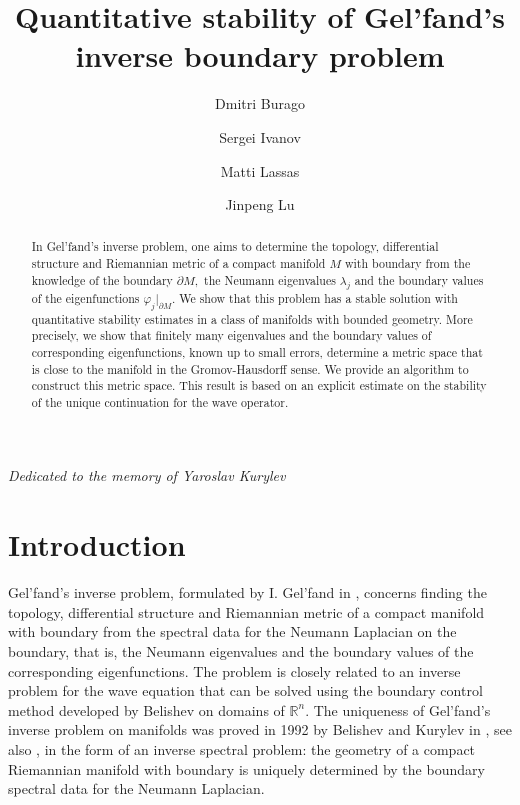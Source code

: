 \documentclass[11pt,letterpaper]{amsart}
\title[Quantitative stability of Gel'fand's inverse boundary problem]{Quantitative stability of Gel'fand's inverse boundary problem}
\author[D. Burago]{Dmitri Burago}
\author[S. Ivanov]{Sergei Ivanov}
\author[M. Lassas]{Matti Lassas}
\author[J. Lu]{Jinpeng Lu}
\date{}
\numberwithin{equation}{section}
\theoremstyle{definition}
\theoremstyle{plain}
\theoremstyle{definition}
\theoremstyle{plain}
\theoremstyle{definition}
\theoremstyle{plain}
\begin{document}
\maketitle

\vspace*{-0.5cm}
\begin{center}
\emph{Dedicated to the memory of Yaroslav Kurylev}
\end{center}

\begin{abstract}
In Gel'fand's inverse problem, one aims to determine the topology, differential structure and Riemannian metric of a compact manifold $M$ with boundary from the knowledge of the boundary $\partial M,$ the Neumann eigenvalues $\lambda_j$ and the boundary values of the eigenfunctions $\varphi_j|_{\partial M}$. We show that this problem has a stable solution with quantitative stability estimates in a class of manifolds with bounded geometry. More precisely, we show that finitely many eigenvalues and the boundary values of corresponding eigenfunctions, known up to small errors, determine a metric space that is close to the manifold in the Gromov-Hausdorff sense. We provide an algorithm to construct this metric space. This result is based on  an explicit estimate on the stability of the unique continuation for the wave operator.  
\end{abstract}


\section{Introduction} \label{section-intro}




Gel'fand's inverse problem, formulated by I. Gel'fand in \cite{G}, concerns finding the topology, differential structure and Riemannian metric of a compact manifold with boundary from the spectral data for the Neumann Laplacian on the boundary,
that is, the Neumann eigenvalues and the boundary values of the corresponding eigenfunctions. 
The problem is closely related to an inverse problem for the wave equation that can be solved using the boundary control method developed by  Belishev \cite{Bel1} on domains of $\mathbb R^n$. 
The uniqueness of Gel'fand's inverse problem on manifolds was proved in 1992
by Belishev and Kurylev  in \cite{BK}, see also \cite{AKKLT,Bel2,Bel3,Caday,KrKL,KOP}, in the form of an inverse spectral problem: the geometry of a compact Riemannian manifold with boundary is uniquely determined by the boundary spectral data for the Neumann Laplacian. 
\end{document}
